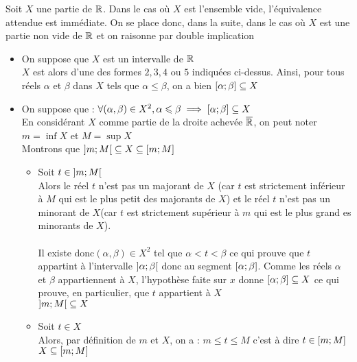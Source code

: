 \begin{dem}
    Soit \(X\) une partie de \(\mathbb{R}\).
    Dans le cas où \(X\) est l'ensemble vide, l'équivalence attendue est immédiate. On se place donc, dans la suite, dans le cas où \(X\) est une partie non vide de \(\mathbb{R}\) et on raisonne par double implication
    \begin{itemize}
        \item[\impdir] On suppose que \(X\) est un intervalle de \(\mathbb{R}\)\\
        \(X\) est alors d'une des formes \( 2, 3, 4\) ou \(5\) indiquées ci-dessus. Ainsi, pour tous réels \(\alpha\) et \(\beta\) dans \(X\) tels que \(\alpha \leq \beta\), on a bien \(\left[\alpha;\beta\right] \subseteq X\)
        \item[\imprec] On suppose que : \(\forall (\alpha,\beta) \in X^2, \alpha \leqslant \beta \implies \left[\alpha;\beta\right] \subseteq X \) \\
        En considérant \(X\) comme partie de la droite achevée \(\overline{\mathbb{R}}\), on peut noter \(m = \inf X\) et \(M = \sup X\) \\
        Montrons que \(\left]m;M\right[ \subseteq X \subseteq \left[m;M\right]\)
        \begin{itemize}
            \item Soit \(t\in \left]m;M\right[\) \\
            Alors le réel \(t\) n'est pas un majorant de \(X\) (car \(t\) est strictement inférieur à \(M\) qui est le plus petit des majorants de \(X\)) et le réel \(t\) n'est pas un minorant de \(X\)(car \(t\) est strictement supérieur à \(m\) qui est le plus grand es minorants de \(X\)). \\
            ~\\
            Il existe donc\((\alpha, \beta) \in X^2\) tel que \(\alpha <t<\beta\) ce qui prouve que \(t\) appartint à l'intervalle \(\left]\alpha;\beta\right[\) donc au segment \(\left[\alpha;\beta\right]\). Comme les réels \(\alpha\) et \(\beta\) appartiennent à \(X\), l'hypothèse faite sur \(x\) donne \(\left[\alpha;\beta\right] \subseteq X\) ce qui prouve, en particulier, que \(t\) appartient à \(X\)\\
            \conclusion \(\left]m;M\right[ \subseteq X\)
            \item Soit \(t\in X\)\\
            Alors, par définition de \(m\) et \(X\), on a : \(m\leq t\leq M\) c'est à dire \(t\in \left[m;M\right]\) \\
            \conclusion \(X \subseteq \left[m;M\right] \)
        \end{itemize} 

\end{itemize}
\end{dem}
